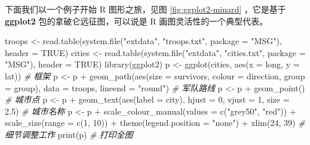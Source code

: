 \documentclass[
  b5paper,
  UTF8,twoside]{book}
\newenvironment{Shaded}{\begin{snugshade}}{\end{snugshade}}
\newcommand{\AttributeTok}[1]{\textcolor[rgb]{0.77,0.63,0.00}{#1}}
\newcommand{\CommentTok}[1]{\textcolor[rgb]{0.56,0.35,0.01}{\textit{#1}}}
\newcommand{\ConstantTok}[1]{\textcolor[rgb]{0.00,0.00,0.00}{#1}}
\newcommand{\DecValTok}[1]{\textcolor[rgb]{0.00,0.00,0.81}{#1}}
\newcommand{\FloatTok}[1]{\textcolor[rgb]{0.00,0.00,0.81}{#1}}
\newcommand{\FunctionTok}[1]{\textcolor[rgb]{0.00,0.00,0.00}{#1}}
\newcommand{\NormalTok}[1]{#1}
\newcommand{\OtherTok}[1]{\textcolor[rgb]{0.56,0.35,0.01}{#1}}
\newcommand{\SpecialCharTok}[1]{\textcolor[rgb]{0.00,0.00,0.00}{#1}}
\newcommand{\StringTok}[1]{\textcolor[rgb]{0.31,0.60,0.02}{#1}}
\begin{document}
下面我们以一个例子开始 R 图形之旅，见图 \ref{fig:ggplot2-minard} ，它是基于 \textbf{ggplot2} 包的拿破仑远征图，可以说是 R 画图灵活性的一个典型代表。





\begin{Shaded}
\begin{Highlighting}[]
\NormalTok{troops }\OtherTok{\textless{}{-}} \FunctionTok{read.table}\NormalTok{(}\FunctionTok{system.file}\NormalTok{(}\StringTok{"extdata"}\NormalTok{, }\StringTok{"troops.txt"}\NormalTok{, }\AttributeTok{package =} \StringTok{"MSG"}\NormalTok{), }\AttributeTok{header =} \ConstantTok{TRUE}\NormalTok{)}
\NormalTok{cities }\OtherTok{\textless{}{-}} \FunctionTok{read.table}\NormalTok{(}\FunctionTok{system.file}\NormalTok{(}\StringTok{"extdata"}\NormalTok{, }\StringTok{"cities.txt"}\NormalTok{, }\AttributeTok{package =} \StringTok{"MSG"}\NormalTok{), }\AttributeTok{header =} \ConstantTok{TRUE}\NormalTok{)}
\FunctionTok{library}\NormalTok{(ggplot2)}
\NormalTok{p }\OtherTok{\textless{}{-}} \FunctionTok{ggplot}\NormalTok{(cities, }\FunctionTok{aes}\NormalTok{(}\AttributeTok{x =}\NormalTok{ long, }\AttributeTok{y =}\NormalTok{ lat)) }\CommentTok{\# 框架}
\NormalTok{p }\OtherTok{\textless{}{-}}\NormalTok{ p }\SpecialCharTok{+} \FunctionTok{geom\_path}\NormalTok{(}\FunctionTok{aes}\NormalTok{(}\AttributeTok{size =}\NormalTok{ survivors, }\AttributeTok{colour =}\NormalTok{ direction, }\AttributeTok{group =}\NormalTok{ group), }
                   \AttributeTok{data =}\NormalTok{ troops, }\AttributeTok{lineend =} \StringTok{"round"}\NormalTok{) }\CommentTok{\# 军队路线}
\NormalTok{p }\OtherTok{\textless{}{-}}\NormalTok{ p }\SpecialCharTok{+} \FunctionTok{geom\_point}\NormalTok{() }\CommentTok{\# 城市点}
\NormalTok{p }\OtherTok{\textless{}{-}}\NormalTok{ p }\SpecialCharTok{+} \FunctionTok{geom\_text}\NormalTok{(}\FunctionTok{aes}\NormalTok{(}\AttributeTok{label =}\NormalTok{ city), }\AttributeTok{hjust =} \DecValTok{0}\NormalTok{, }\AttributeTok{vjust =} \DecValTok{1}\NormalTok{, }\AttributeTok{size =} \FloatTok{2.5}\NormalTok{) }\CommentTok{\# 城市名称}
\NormalTok{p }\OtherTok{\textless{}{-}}\NormalTok{ p }\SpecialCharTok{+} \FunctionTok{scale\_colour\_manual}\NormalTok{(}\AttributeTok{values =} \FunctionTok{c}\NormalTok{(}\StringTok{"grey50"}\NormalTok{, }\StringTok{"red"}\NormalTok{)) }\SpecialCharTok{+} 
  \FunctionTok{scale\_size}\NormalTok{(}\AttributeTok{range =} \FunctionTok{c}\NormalTok{(}\DecValTok{1}\NormalTok{, }\DecValTok{10}\NormalTok{)) }\SpecialCharTok{+}
  \FunctionTok{theme}\NormalTok{(}\AttributeTok{legend.position =} \StringTok{"none"}\NormalTok{) }\SpecialCharTok{+} 
  \FunctionTok{xlim}\NormalTok{(}\DecValTok{24}\NormalTok{, }\DecValTok{39}\NormalTok{) }\CommentTok{\# 细节调整工作}
\FunctionTok{print}\NormalTok{(p) }\CommentTok{\# 打印全图}
\end{Highlighting}
\end{Shaded}
\end{document}
